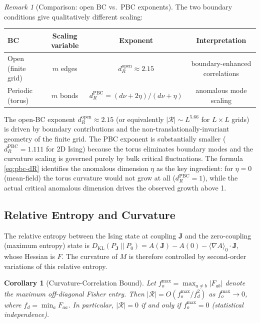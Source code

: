 \documentclass[11pt]{article}
\newtheorem{corollary}[theorem]{Corollary}
\theoremstyle{definition}
\theoremstyle{remark}
\newtheorem{remark}[theorem]{Remark}
\newcommand{\Fish}{F}
\newcommand{\Met}{M}
\newcommand{\coupl}{\mathbf{J}}
\newcommand{\Scal}{\mathcal{R}}
\begin{document}
\begin{remark}[Comparison: open BC vs.\ PBC exponents]
\label{rem:bc-comparison}
The two boundary conditions give qualitatively different scaling:
\begin{center}
\renewcommand{\arraystretch}{1.2}
\begin{tabular}{lccc}
\toprule
BC & Scaling variable & Exponent & Interpretation \\
\midrule
Open (finite grid) & $m$ edges & $d_R^{\mathrm{open}} \approx 2.15$ & boundary-enhanced correlations \\
Periodic (torus) & $m$ bonds & $d_R^{\mathrm{PBC}} = (d\nu+2\eta)/(d\nu+\eta)$ & anomalous mode scaling \\
\bottomrule
\end{tabular}
\end{center}
The open-BC exponent $d_R^{\mathrm{open}} \approx 2.15$ (or equivalently $|\Scal| \sim L^{5.66}$
for $L \times L$ grids) is driven by boundary contributions and
the non-translationally-invariant geometry of the finite grid. The PBC exponent
is substantially smaller ($d_R^{\mathrm{PBC}} = 1.111$ for 2D Ising) because the torus
eliminates boundary modes and the curvature scaling is governed purely by bulk
critical fluctuations. The formula \eqref{eq:pbc-dR} identifies the anomalous
dimension $\eta$ as the key ingredient: for $\eta = 0$ (mean-field) the torus
curvature would not grow at all ($d_R^{\mathrm{PBC}} = 1$), while the actual
critical anomalous dimension drives the observed growth above 1.
\end{remark}

\subsection{Relative Entropy and Curvature}

The relative entropy between
the Ising state at coupling $\coupl$ and the zero-coupling (maximum
entropy) state is $D_{\mathrm{KL}}(P_{\coupl} \| P_0) = A(\coupl)
- A(0) - \langle \nabla A \rangle_0 \cdot \coupl$, whose Hessian is
$\Fish$. The curvature of $\Met$ is therefore controlled by second-order
variations of this relative entropy.

\begin{corollary}[Curvature-Correlation Bound]
\label{cor:curvature-corr}
Let $f_o^{\max} = \max_{a \neq b} |\Fish_{ab}|$ denote the maximum
off-diagonal Fisher entry. Then
$|\Scal| = O(f_o^{\max} / f_d^2)$ as $f_o^{\max} \to 0$,
where $f_d = \min_a \Fish_{aa}$. In particular, $|\Scal| = 0$ if and
only if $f_o^{\max} = 0$ (statistical independence).
\end{corollary}
\end{document}
